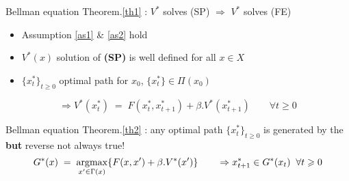 \noindent Bellman equation Theorem.\ref{th1} : $V^{*}$ solves (SP) $\Rightarrow$ $V^{*}$ solves (FE)

\begin{boxH}
    \begin{theorem}\label{th2}
        \begin{itemize}
            \item Assumption \ref{as1} \& \ref{as2} hold
            \item $V^{*}(x)$ solution of \textbf{(SP)} is well defined for all $x \in X$
            \item $\{x_{t}^{*}\}_{t\geqslant 0}$ optimal path for $x_{0}$\textrm{, }$\{x_{t}^{*}\} \in \Pi(x_{0})$
        \end{itemize}
        \begin{equation*}
            \Longrightarrow  V^{*}(x_{t}^{*}) \; = \; F(x_{t}^{*},x_{t+1}^{*}) + \beta .V^{*}(x_{t+1}^{*}) \qquad \forall t \geqslant 0
        \end{equation*}
    \end{theorem} 
\end{boxH}
\noindent Bellman equation Theorem.\ref{th2} : any optimal path $\{x_{t}^{*}\}_{t\geqslant 0}$ is generated by the  \textbf{but} reverse not always true!
\begin{equation*}
    G^{*}(x) \; = \; \operatorname*{argmax}_{x' \in \Gamma(x)} \{ F(x,x') + \beta.V^{*}(x')\} \qquad
    \Rightarrow x_{t+1}^{*} \in G^{*}(x_{t}) \; \; \forall t \geqslant 0
\end{equation*}
